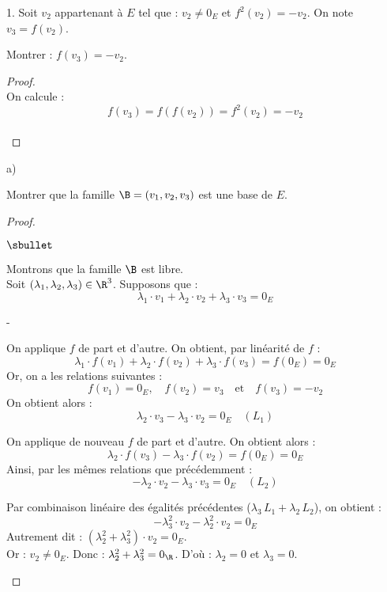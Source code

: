 \documentclass[11pt]{article}%
\begin{document}
\begin{noliste}{1.}
\noindent 
Soit $v_2$ appartenant à $E$ tel que : $v_2\neq 0_E$ et
$f^2(v_2)=-v_2$. On note $v_3=f(v_2)$.
 
\item Montrer : $f(v_3)=-v_2$.
 
  \begin{proof}~\\
    On calcule :
    \[
    f(v_3) = f(f(v_2)) = f^2(v_2) = -v_2
    \]
    ~\\[-1cm]
  \end{proof}
 
 \item 
 \begin{noliste}{a)}
  \item Montrer que la famille $\B=(v_1,v_2,v_3)$ est une base 
  de $E$.
  
  \begin{proof}~
    \begin{noliste}{$\sbullet$}
    \item Montrons que la famille $\B$ est libre.\\
      Soit $(\lambda_1, \lambda_2, \lambda_3) \in \R^3$. Supposons que
      :
      \[
      \lambda_1 \cdot v_1 + \lambda_2 \cdot v_2 + \lambda_3 \cdot v_3
      = 0_E
      \]
      \begin{noliste}{-}
      \item On applique $f$ de part et d'autre. On obtient, par
        linéarité de $f$ :
	\[
        \lambda_1 \cdot f(v_1) + \lambda_2 \cdot f(v_2) + 
        \lambda_3 \cdot f(v_3) = f(0_E) = 0_E
	\]
	Or, on a les relations suivantes :
	\[
        f(v_1)=0_E, \quad f(v_2)=v_3 \quad \mbox{et} \quad 
        f(v_3)=-v_2
	\]
	On obtient alors :
	\[
        \lambda_2 \cdot v_3 - \lambda_3 \cdot v_2 = 0_E \quad (L_1)
	\]


        \newpage

	
      \item On applique de nouveau $f$ de part et d'autre. On obtient
        alors :
	\[
        \lambda_2 \cdot f(v_3) - \lambda_3 \cdot f(v_2) = f(0_E) = 0_E
	\]
	Ainsi, par les mêmes relations que précédemment :
	\[
        -\lambda_2 \cdot v_2 - \lambda_3 \cdot v_3 = 0_E \quad (L_2)
	\]
	
      \item Par combinaison linéaire des égalités précédentes
        ($\lambda_3 \, L_1 + \lambda_2 \, L_2$), on obtient :
	\[
        -\lambda_3^2 \cdot v_2 - \lambda_2^2 \cdot v_2 = 0_E
	\]
	Autrement dit : $(\lambda_2^2 + \lambda_3^2) \cdot 
	v_2=0_E$.\\[.1cm]
	Or : $v_2 \neq 0_E$. Donc : $\lambda_2^2 + \lambda_3^2 = 
	0_{\R}$. D'où : $\lambda_2=0$ et $\lambda_3=0$.
	

\end{noliste}
\end{noliste}
\end{proof}
\end{noliste}
\end{noliste}
\end{document}
